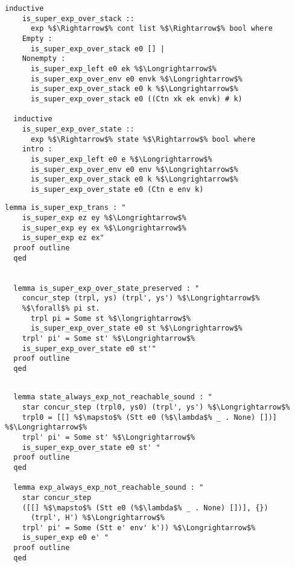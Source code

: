 \documentclass{article}
\begin{document}
\begin{lstlisting}[style=codestyle1, escapechar=\%]
  inductive
    is_super_exp_over_stack ::
      exp %$\Rightarrow$% cont list %$\Rightarrow$% bool where
    Empty :
      is_super_exp_over_stack e0 [] |
    Nonempty :
      is_super_exp_left e0 ek %$\Longrightarrow$%
      is_super_exp_over_env e0 envk %$\Longrightarrow$%
      is_super_exp_over_stack e0 k %$\Longrightarrow$%
      is_super_exp_over_stack e0 ((Ctn xk ek envk) # k)

  inductive
    is_super_exp_over_state ::
      exp %$\Rightarrow$% state %$\Rightarrow$% bool where
    intro :
      is_super_exp_left e0 e %$\Longrightarrow$%
      is_super_exp_over_env e0 env %$\Longrightarrow$%
      is_super_exp_over_stack e0 k %$\Longrightarrow$%
      is_super_exp_over_state e0 (Ctn e env k)

  \end{lstlisting}

\begin{lstlisting}[style=codestyle1, escapechar=\%]
  lemma is_super_exp_trans : "
    is_super_exp ez ey %$\Longrightarrow$%
    is_super_exp ey ex %$\Longrightarrow$%
    is_super_exp ez ex"
  proof outline 
  qed


  lemma is_super_exp_over_state_preserved : "
    concur_step (trpl, ys) (trpl', ys') %$\Longrightarrow$%
    %$\forall$% pi st.
      trpl pi = Some st %$\longrightarrow$%
      is_super_exp_over_state e0 st %$\Longrightarrow$%
    trpl' pi' = Some st' %$\Longrightarrow$%
    is_super_exp_over_state e0 st'"
  proof outline 
  qed
  \end{lstlisting}


\begin{lstlisting}[style=codestyle1, escapechar=\%]

  lemma state_always_exp_not_reachable_sound : "
    star concur_step (trpl0, ys0) (trpl', ys') %$\Longrightarrow$%
    trpl0 = [[] %$\mapsto$% (Stt e0 (%$\lambda$% _ . None) [])] %$\Longrightarrow$%
    trpl' pi' = Some st' %$\Longrightarrow$%
    is_super_exp_over_state e0 st' "
  proof outline
  qed

  lemma exp_always_exp_not_reachable_sound : "
    star concur_step
    ([[] %$\mapsto$% (Stt e0 (%$\lambda$% _ . None) [])], {})
      (trpl', H') %$\Longrightarrow$%
    trpl' pi' = Some (Stt e' env' k')) %$\Longrightarrow$%
    is_super_exp e0 e' " 
  proof outline
  qed

  \end{lstlisting}
\end{document}
